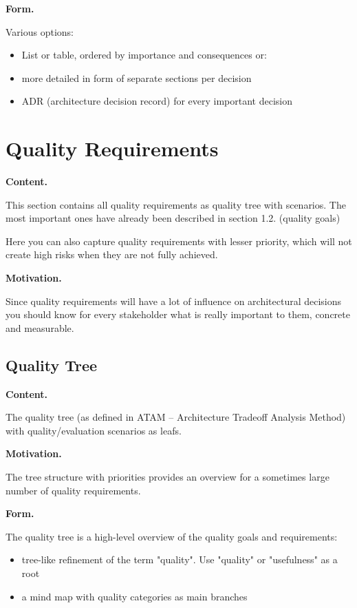 \documentclass[]{article}
\begin{document}
\textbf{Form.}

Various options:

\begin{itemize}
\item
  List or table, ordered by importance and consequences or:
\item
  more detailed in form of separate sections per decision
\item
  ADR (architecture decision record) for every important decision
\end{itemize}

\hypertarget{section-quality-scenarios}{%
\section{Quality Requirements}\label{section-quality-scenarios}}

\textbf{Content.}

This section contains all quality requirements as quality tree with
scenarios. The most important ones have already been described in
section 1.2. (quality goals)

Here you can also capture quality requirements with lesser priority,
which will not create high risks when they are not fully achieved.

\textbf{Motivation.}

Since quality requirements will have a lot of influence on architectural
decisions you should know for every stakeholder what is really important
to them, concrete and measurable.

\hypertarget{_quality_tree}{%
\subsection{Quality Tree}\label{_quality_tree}}

\textbf{Content.}

The quality tree (as defined in ATAM -- Architecture Tradeoff Analysis
Method) with quality/evaluation scenarios as leafs.

\textbf{Motivation.}

The tree structure with priorities provides an overview for a sometimes
large number of quality requirements.

\textbf{Form.}

The quality tree is a high-level overview of the quality goals and
requirements:

\begin{itemize}
\item
  tree-like refinement of the term "quality". Use "quality" or
  "usefulness" as a root
\item
  a mind map with quality categories as main branches
\end{itemize}
\end{document}
